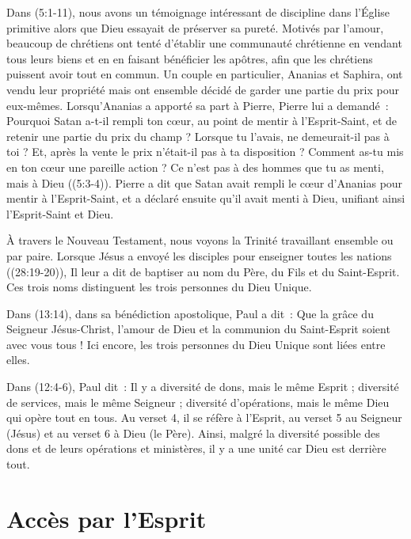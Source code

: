 Dans (5:1-11), nous avons un témoignage intéressant de
 discipline dans l'Église primitive alors que Dieu essayait de préserver
 sa pureté.
 Motivés par l'amour, beaucoup de chrétiens ont tenté d'établir une
 communauté chrétienne en vendant tous leurs biens et en en faisant
 bénéficier les apôtres, afin que les chrétiens puissent avoir tout en
 commun. Un couple en particulier, Ananias et Saphira, ont vendu leur
 propriété mais ont ensemble décidé de garder une partie du prix pour
 eux-mêmes. Lorsqu'Ananias a apporté sa part à Pierre, Pierre lui a
 demandé~: \og Pourquoi Satan a-t-il rempli ton cœur, au point de mentir
 à l'Esprit-Saint, et de retenir une partie du prix du champ ? Lorsque tu
 l'avais, ne demeurait-il pas à toi ? Et, après la vente le prix n'était-il
 pas à ta disposition ?
 Comment as-tu mis en ton cœur une pareille action ?
 Ce n'est pas à des hommes que tu as menti, mais à Dieu \fg{}
 ((5:3-4)).
 Pierre a dit que Satan avait rempli le cœur d'Ananias pour mentir
 à l'Esprit-Saint, et a déclaré ensuite qu'il avait menti à Dieu, unifiant
 ainsi l'Esprit-Saint et Dieu.

À travers le Nouveau Testament, nous voyons la Trinité travaillant ensemble
 ou par paire. Lorsque Jésus a envoyé les disciples pour enseigner toutes
 les nations ((28:19-20)), Il leur a dit de baptiser au nom
 du Père, du Fils et du Saint-Esprit. Ces trois noms distinguent les trois
 personnes du Dieu Unique.

Dans (13:14), dans sa bénédiction apostolique, Paul a dit~:
 \og Que la grâce du Seigneur Jésus-Christ, l'amour de Dieu et la communion
 du Saint-Esprit soient avec vous tous ! \fg{}
 Ici encore, les trois personnes du Dieu Unique sont liées entre elles.

Dans (12:4-6), Paul dit~:
 \og Il y a diversité de dons, mais le même Esprit ; diversité de services,
 mais le même Seigneur ; diversité d'opérations, mais le même Dieu
 qui opère tout en tous. \fg{}
 Au verset 4, il se réfère à l'Esprit, au verset 5 au Seigneur (Jésus)
 et au verset 6 à Dieu (le Père).
 Ainsi, malgré la diversité possible des dons et de leurs opérations
 et ministères, il y a une unité car Dieu est derrière tout.


\section*{Accès par l'Esprit}

